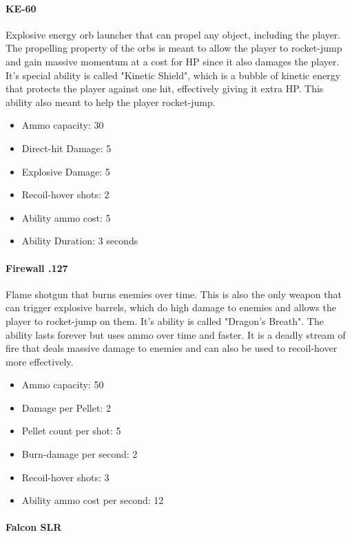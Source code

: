 \documentclass[12pt]{article}
\begin{document}
\paragraph{KE-60}

Explosive energy orb launcher that can propel any object, including the player. The propelling property of the orbs is meant to allow the player to rocket-jump and gain massive momentum at a cost for HP since it also damages the player. It's special ability is called "Kinetic Shield", which is a bubble of kinetic energy that protects the player against one hit, effectively giving it extra HP. This ability also meant to help the player rocket-jump. 

\begin{itemize}
	\item Ammo capacity: 30
	\item Direct-hit Damage: 5
	\item Explosive Damage: 5
	\item Recoil-hover shots: 2
	\item Ability ammo cost: 5
	\item Ability Duration: 3 seconds
\end{itemize} 


\paragraph{Firewall .127}

Flame shotgun that burns enemies over time. This is also the only weapon that can trigger explosive barrels, which do high damage to enemies and allows the player to rocket-jump on them. It's ability is called "Dragon's Breath". The ability lasts forever but uses ammo over time and faster. It is a deadly stream of fire that deals massive damage to enemies and can also be used to recoil-hover more effectively.

\begin{itemize}
	\item Ammo capacity: 50
	\item Damage per Pellet: 2
	\item Pellet count per shot: 5
	\item Burn-damage per second: 2
	\item Recoil-hover shots: 3
	\item Ability ammo cost per second: 12
\end{itemize} 

\paragraph{Falcon SLR}
\end{document}
